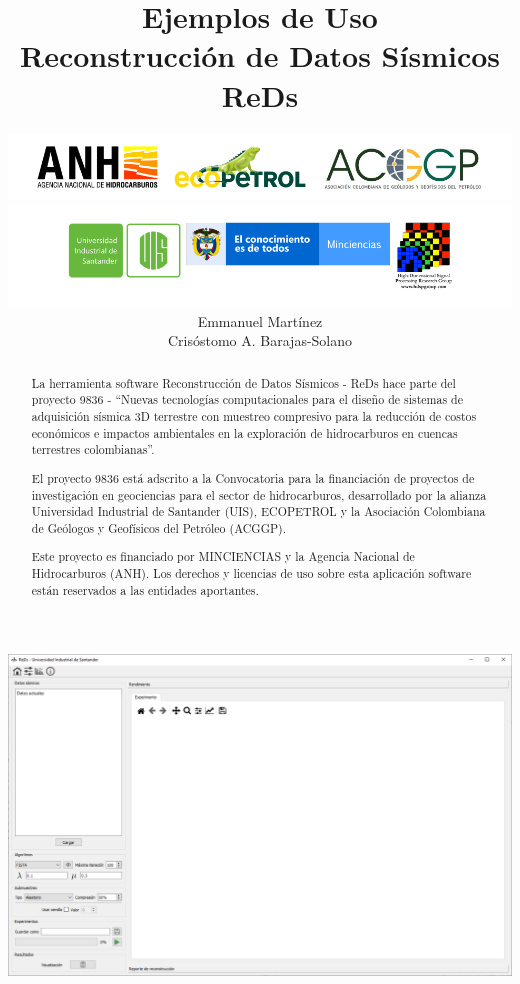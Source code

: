 \documentclass[12pt,twoside,letter]{ol-softwaremanual}
\title{\large{Ejemplos de Uso}\\ \vspace{10mm} \huge{Reconstrucción de Datos Sísmicos}\\ \vspace{5mm} \huge{ReDs}}
\author{\includegraphics[width=14cm]{figures/upper_logo.png} \\ \includegraphics[width=14cm]{figures/lower_logo.png} \\ Emmanuel Martínez \\ Crisóstomo A. Barajas-Solano}
\begin{document}
\maketitle

\newpage\null\thispagestyle{empty}\newpage

\begin{center}
\includegraphics[width=.9\linewidth]{header.png}
\end{center}
\begin{abstract}
La herramienta software Reconstrucción de Datos Sísmicos - ReDs hace parte del proyecto 9836 - ``Nuevas tecnologías computacionales para el diseño de sistemas de adquisición sísmica 3D terrestre con muestreo compresivo para la reducción de costos económicos e impactos ambientales en la exploración de hidrocarburos en cuencas terrestres colombianas''.

El proyecto 9836 está adscrito a la Convocatoria para la financiación de proyectos de investigación en geociencias para el sector de hidrocarburos, desarrollado por la alianza Universidad Industrial de Santander (UIS), ECOPETROL y la Asociación Colombiana de Geólogos y Geofísicos del Petróleo (ACGGP). 

Este proyecto es financiado por MINCIENCIAS y la Agencia Nacional de Hidrocarburos (ANH). Los derechos y licencias de uso sobre esta aplicación software están reservados a las entidades aportantes.
\end{abstract}
\end{document}
